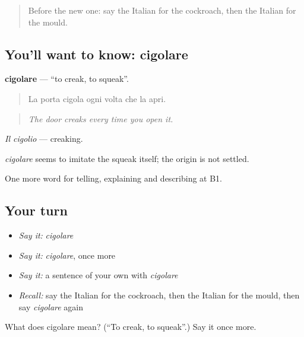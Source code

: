 \begin{quote}
Before the new one: say the Italian for the cockroach, then the Italian for the mould.
\end{quote}

\subsection*{You'll want to know: cigolare}
\textbf{cigolare} — \textquotedblleft{}to creak, to squeak\textquotedblright{}.

\begin{quote}
La porta cigola ogni volta che la apri.
\end{quote}

\begin{quote}
\emph{The door creaks every time you open it.}
\end{quote}

\emph{Il cigolio} — creaking.

\begin{cousinweb}
\emph{cigolare} seems to imitate the squeak itself; the origin is not settled.
\end{cousinweb}

\begin{grammarlens}[title={What you've built}]
One more word for telling, explaining and describing at B1.
\end{grammarlens}

\subsection*{Your turn}
\begin{itemize}
\raggedright
  \item \emph{Say it:} \emph{cigolare}
  \item \emph{Say it:} \emph{cigolare}, once more
  \item \emph{Say it:} a sentence of your own with \emph{cigolare}
  \item \emph{Recall:} say the Italian for the cockroach, then the Italian for the mould, then say \emph{cigolare} again
\end{itemize}

\begin{tcolorbox}[breakable,colback=teal!4,colframe=teal!35!black,title={Before you move on}]
What does cigolare mean? (\textquotedblleft{}To creak, to squeak\textquotedblright{}.) Say it once more.
\end{tcolorbox}
